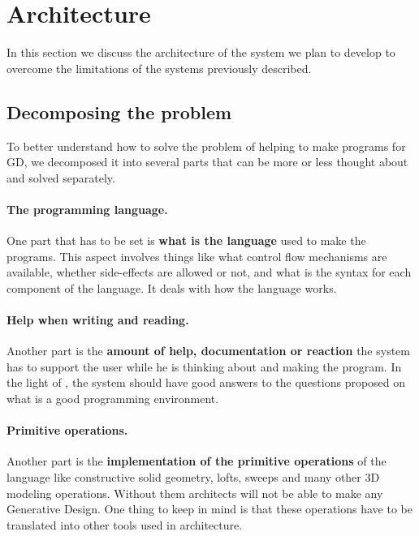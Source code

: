 \documentclass{./llncs2e/llncs}
\begin{document}


\section{Architecture}
	In this section we discuss the architecture of the system we plan to develop to overcome the limitations of the systems previously described.

\subsection{Decomposing the problem}
	To better understand how to solve the problem of helping to make programs for GD, we decomposed it into several parts that can be more or less thought about and solved separately.
	
	\paragraph{The programming language.}
	One part that has to be set is \textbf{what is the language} used to make the programs.
	This aspect involves things like what control flow mechanisms are available, whether side-effects are allowed or not, and what is the syntax for each component of the language.
	It deals with how the language works.

	\paragraph{Help when writing and reading.}
	Another part is the \textbf{amount of help, documentation or reaction} the system has to support the user while he is thinking about and making the program.
	In the light of \cite{victor2012learnable}, the system should have good answers to the questions proposed on what is a good programming environment.

	\paragraph{Primitive operations.}
	Another part is the \textbf{implementation of the primitive operations} of the language like constructive solid geometry, lofts, sweeps and many other 3D modeling operations.
	Without them architects will not be able to make any Generative Design.
	One thing to keep in mind is that these operations have to be translated into other tools used in architecture.
\end{document}
